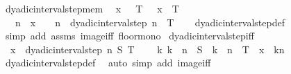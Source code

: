 \begin{isabellebody}
\ dyadic{\isacharunderscore}{\kern0pt}interval{\isacharunderscore}{\kern0pt}step{\isacharunderscore}{\kern0pt}mem{\isacharcolon}{\kern0pt}\isanewline
\ \ x\ {\isasymge}\ {}{\isachardoublequoteclose}\ {\isachardoublequoteopen}T\ {\isasymge}\ {}{\isachardoublequoteclose}\ {\isachardoublequoteopen}x\ {\isasymle}\ T{\isachardoublequoteclose}\ \isanewline
\ \ \ {\isachardoublequoteopen}{\isasymlfloor}{}{\isacharcircum}{\kern0pt}n\ {\isacharasterisk}{\kern0pt}\ x{\isasymrfloor}\ {\isacharslash}{\kern0pt}\ {}\ {\isacharcircum}{\kern0pt}\ n\ {\isasymin}\ dyadic{\isacharunderscore}{\kern0pt}interval{\isacharunderscore}{\kern0pt}step\ n\ {}\ T{\isachardoublequoteclose}\isanewline
%
\isadelimproof
\ \ %
\endisadelimproof
%
\isatagproof
{}\isamarkupfalse%
\ dyadic{\isacharunderscore}{\kern0pt}interval{\isacharunderscore}{\kern0pt}step{\isacharunderscore}{\kern0pt}def\ \isamarkupfalse%
\ {\isacharparenleft}{\kern0pt}simp\ add{\isacharcolon}{\kern0pt}\ assms\ image{\isacharunderscore}{\kern0pt}iff\ floor{\isacharunderscore}{\kern0pt}mono{\isacharparenright}{\kern0pt}%
\endisatagproof
{\isafoldproof}%
%
\isadelimproof
\isanewline
%
\endisadelimproof
\isanewline
{}\isamarkupfalse%
\ dyadic{\isacharunderscore}{\kern0pt}interval{\isacharunderscore}{\kern0pt}step{\isacharunderscore}{\kern0pt}iff{\isacharcolon}{\kern0pt}\ \isanewline
\ \ {\isachardoublequoteopen}x\ {\isasymin}\ dyadic{\isacharunderscore}{\kern0pt}interval{\isacharunderscore}{\kern0pt}step\ n\ S\ T\ {\isasymlongleftrightarrow}\isanewline
\ \ \ {\isacharparenleft}{\kern0pt}{\isasymexists}k{\isachardot}{\kern0pt}\ k\ {\isasymge}\ {\isasymlceil}{}{\isacharcircum}{\kern0pt}n\ {\isacharasterisk}{\kern0pt}\ S{\isasymrceil}\ {\isasymand}\ k\ {\isasymle}\ {\isasymlfloor}{}{\isacharcircum}{\kern0pt}n\ {\isacharasterisk}{\kern0pt}\ T{\isasymrfloor}\ {\isasymand}\ x\ {\isacharequal}{\kern0pt}\ k{\isacharslash}{\kern0pt}{}{\isacharcircum}{\kern0pt}n{\isacharparenright}{\kern0pt}{\isachardoublequoteclose}\isanewline
%
\isadelimproof
\ \ %
\endisadelimproof
%
\isatagproof
{}\isamarkupfalse%
\ dyadic{\isacharunderscore}{\kern0pt}interval{\isacharunderscore}{\kern0pt}step{\isacharunderscore}{\kern0pt}def\ \isamarkupfalse%
\ {\isacharparenleft}{\kern0pt}auto\ simp\ add{\isacharcolon}{\kern0pt}\ image{\isacharunderscore}{\kern0pt}iff{\isacharparenright}{\kern0pt}%
\endisatagproof
{\isafoldproof}%

\end{isabellebody}
